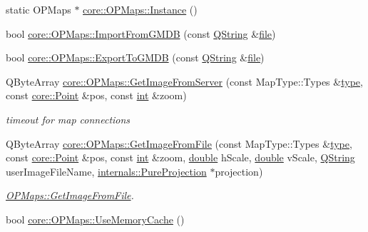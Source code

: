 \begin{DoxyCompactItemize}
static O\-P\-Maps $\ast$ \hyperlink{group___o_p_map_widget_ga20822cc13b7089e598c95023a90ed036}{core\-::\-O\-P\-Maps\-::\-Instance} ()
\item 
bool \hyperlink{group___o_p_map_widget_ga50b468c09bac4de46905661839aa2477}{core\-::\-O\-P\-Maps\-::\-Import\-From\-G\-M\-D\-B} (const \hyperlink{group___u_a_v_objects_plugin_gab9d252f49c333c94a72f97ce3105a32d}{Q\-String} \&\hyperlink{uavobjecttemplate_8m_a97c04efa65bcf0928abf9260bc5cbf46}{file})
\item 
bool \hyperlink{group___o_p_map_widget_ga0e08ede04e7f73ba867d870516a3da12}{core\-::\-O\-P\-Maps\-::\-Export\-To\-G\-M\-D\-B} (const \hyperlink{group___u_a_v_objects_plugin_gab9d252f49c333c94a72f97ce3105a32d}{Q\-String} \&\hyperlink{uavobjecttemplate_8m_a97c04efa65bcf0928abf9260bc5cbf46}{file})
\item 
Q\-Byte\-Array \hyperlink{group___o_p_map_widget_ga03e1a814248920f31520f38e2ed5d412}{core\-::\-O\-P\-Maps\-::\-Get\-Image\-From\-Server} (const Map\-Type\-::\-Types \&\hyperlink{glext_8h_a7d05960f4f1c1b11f3177dc963a45d86}{type}, const \hyperlink{structcore_1_1_point}{core\-::\-Point} \&pos, const \hyperlink{ioapi_8h_a787fa3cf048117ba7123753c1e74fcd6}{int} \&zoom)
\begin{DoxyCompactList}\small\item\em timeout for map connections \end{DoxyCompactList}\item 
Q\-Byte\-Array \hyperlink{group___o_p_map_widget_gae60565be4288e3fca3f28642b38d93ea}{core\-::\-O\-P\-Maps\-::\-Get\-Image\-From\-File} (const Map\-Type\-::\-Types \&\hyperlink{glext_8h_a7d05960f4f1c1b11f3177dc963a45d86}{type}, const \hyperlink{structcore_1_1_point}{core\-::\-Point} \&pos, const \hyperlink{ioapi_8h_a787fa3cf048117ba7123753c1e74fcd6}{int} \&zoom, \hyperlink{_super_l_u_support_8h_a8956b2b9f49bf918deed98379d159ca7}{double} h\-Scale, \hyperlink{_super_l_u_support_8h_a8956b2b9f49bf918deed98379d159ca7}{double} v\-Scale, \hyperlink{group___u_a_v_objects_plugin_gab9d252f49c333c94a72f97ce3105a32d}{Q\-String} user\-Image\-File\-Name, \hyperlink{classinternals_1_1_pure_projection}{internals\-::\-Pure\-Projection} $\ast$projection)
\begin{DoxyCompactList}\small\item\em \hyperlink{group___o_p_map_widget_gae60565be4288e3fca3f28642b38d93ea}{O\-P\-Maps\-::\-Get\-Image\-From\-File}. \end{DoxyCompactList}\item 
bool \hyperlink{group___o_p_map_widget_ga2645fe8a750602f5aaa9258af2d7d63e}{core\-::\-O\-P\-Maps\-::\-Use\-Memory\-Cache} ()

\end{DoxyCompactItemize}
